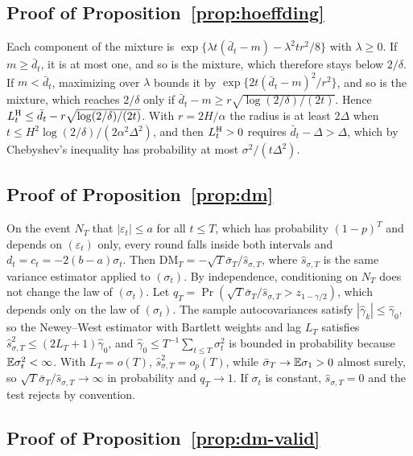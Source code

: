 \subsection{Proof of Proposition~\ref{prop:hoeffding}}

Each component of the mixture is
$\exp\{\lambda t(\bar d_t-m)-\lambda^2tr^2/8\}$ with $\lambda\ge0$. If
$m\ge\bar d_t$, it is at most one, and so is the mixture, which therefore
stays below $2/\delta$. If $m<\bar d_t$, maximizing over $\lambda$ bounds
it by $\exp\{2t(\bar d_t-m)^2/r^2\}$, and so is the mixture, which
reaches $2/\delta$ only if $\bar d_t-m\ge r\sqrt{\log(2/\delta)/(2t)}$.
Hence $L^{\rm H}_t\le\bar d_t-r\sqrt{\log(2/\delta)/(2t)}$. With
$r=2H/\alpha$ the radius is at least $2\Delta$ when
$t\le H^2\log(2/\delta)/(2\alpha^2\Delta^2)$, and then $L^{\rm H}_t>0$
requires $\bar d_t-\Delta>\Delta$, which by Chebyshev's inequality has
probability at most $\sigma^2/(t\Delta^2)$.

\subsection{Proof of Proposition~\ref{prop:dm}}

On the event $N_T$ that $|\varepsilon_t|\le a$ for all $t\le T$, which has
probability $(1-p)^T$ and depends on $(\varepsilon_t)$ only, every round
falls inside both intervals and $d_t=c_t=-2(b-a)\sigma_t$. Then
$\mathrm{DM}_T=-\sqrt T\bar\sigma_T/\hat s_{\sigma,T}$, where
$\hat s_{\sigma,T}$ is the same variance estimator applied to
$(\sigma_t)$. By independence, conditioning on $N_T$ does not change the
law of $(\sigma_t)$. Let $q_T=\Pr(\sqrt T\bar\sigma_T/\hat
s_{\sigma,T}>z_{1-\gamma/2})$, which depends only on the law of
$(\sigma_t)$. The sample autocovariances satisfy
$|\hat\gamma_k|\le\hat\gamma_0$, so the Newey--West estimator with Bartlett
weights and lag $L_T$ satisfies $\hat s_{\sigma,T}^2\le(2L_T+1)\hat\gamma_0$,
and $\hat\gamma_0\le T^{-1}\sum_{t\le T}\sigma_t^2$ is bounded in
probability because $\mathbb{E}\sigma_t^2<\infty$. With $L_T=o(T)$, $\hat
s_{\sigma,T}^2=o_p(T)$, while $\bar\sigma_T\to\mathbb{E}\sigma_1>0$ almost surely,
so $\sqrt T\bar\sigma_T/\hat s_{\sigma,T}\to\infty$ in probability and
$q_T\to1$. If $\sigma_t$ is constant, $\hat s_{\sigma,T}=0$ and the test
rejects by convention.

\subsection{Proof of Proposition~\ref{prop:dm-valid}}

